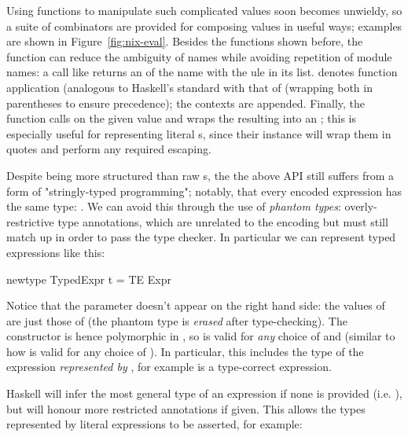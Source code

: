 Using  functions to manipulate such complicated values soon becomes
unwieldy, so a suite of combinators are provided for composing  values
in useful ways; examples are shown in Figure~\ref{fig:nix-eval}. Besides the
 functions shown before, the  function can reduce the
ambiguity of names while avoiding repetition of module names: a call like
 returns an  of the name
 with the  ule in its
 list.  denotes function application (analogous to
Haskell's standard \hs{$}%
with that of  (wrapping both in parentheses to ensure precedence); the
contexts are appended. Finally, the 
function calls  on the given value and wraps the resulting 
into an ; this is especially useful for representing literal
s, since their  instance will wrap them in quotes and
perform any required escaping.

Despite being more structured than raw s, the the above API still
suffers from a form of "stringly-typed programming"; notably, that every encoded
expression has the same type: . We can avoid this through the use of
\emph{phantom types}: overly-restrictive type annotations, which are unrelated
to the encoding but must still match up in order to pass the type checker. In
particular we can represent typed expressions like this:

\begin{haskell}
newtype TypedExpr t = TE Expr
\end{haskell}

Notice that the parameter  doesn't appear on the right hand side: the
values of  are just those of  (the phantom type is
\emph{erased} after type-checking). The  constructor is hence polymorphic
in , so  is valid for \emph{any} choice of 
and  (similar to how  is valid for any choice of
). In particular, this includes the type of the expression
\emph{represented by} , for example  is a
type-correct expression.

Haskell will infer the most general type of an expression if none is provided
(i.e. ), but will honour more restricted annotations
if given. This allows the types represented by literal expressions to be
asserted, for example:

